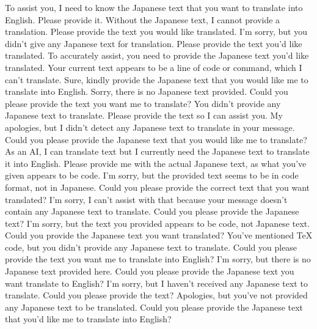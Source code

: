 {%
To assist you, I need to know the Japanese text that you want to translate into English. Please provide it.
Without the Japanese text, I cannot provide a translation. Please provide the text you would like translated.
I'm sorry, but you didn't give any Japanese text for translation. Please provide the text you'd like translated.
To accurately assist, you need to provide the Japanese text you'd like translated. Your current text appears to be a line of code or command, which I can't translate.
Sure, kindly provide the Japanese text that you would like me to translate into English.
Sorry, there is no Japanese text provided. Could you please provide the text you want me to translate?
You didn't provide any Japanese text to translate. Please provide the text so I can assist you.
My apologies, but I didn't detect any Japanese text to translate in your message. Could you please provide the Japanese text that you would like me to translate?
As an AI, I can translate text but I currently need the Japanese text to translate it into English. Please provide me with the actual Japanese text, as what you've given appears to be code.
I'm sorry, but the provided text seems to be in code format, not in Japanese. Could you please provide the correct text that you want translated?
I'm sorry, I can't assist with that because your message doesn't contain any Japanese text to translate. Could you please provide the Japanese text?
I'm sorry, but the text you provided appears to be code, not Japanese text. Could you provide the Japanese text you want translated?
You've mentioned TeX code, but you didn't provide any Japanese text to translate. Could you please provide the text you want me to translate into English?
I'm sorry, but there is no Japanese text provided here. Could you please provide the Japanese text you want translate to English?
I'm sorry, but I haven't received any Japanese text to translate. Could you please provide the text?
Apologies, but you've not provided any Japanese text to be translated. Could you please provide the Japanese text that you'd like me to translate into English?
}
